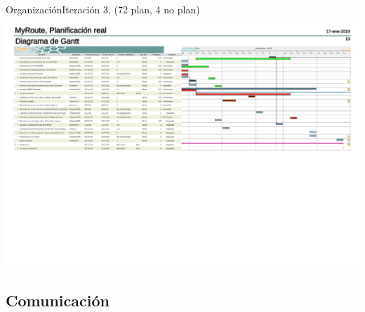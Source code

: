 \documentclass{beamer}
\begin{document}
\begin{frame}{Organizaci\'on}{Iteraci\'on 3, (72 plan, 4 no plan)}
\centering
\hspace{1cm}
\break
\newline
\break
\includegraphics[width=0.8\paperwidth]{images_latex/gantt_itr3}
\end{frame}


\subsection{Comunicaci\'on}
\end{document}
